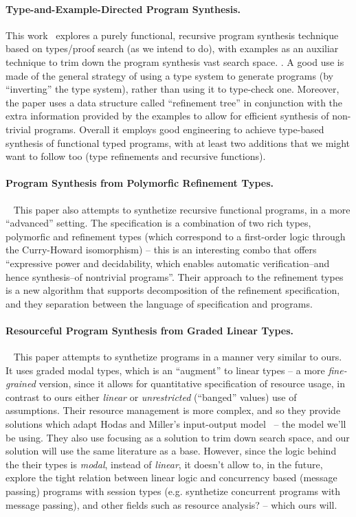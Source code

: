 \documentclass{llncs}
\newcommand{\mypara}[1]{\paragraph{\textbf{#1}.}}
\begin{document}
\mypara{Type-and-Example-Directed Program Synthesis} This
work~\cite{DBLP:conf/pldi/OseraZ15,DBLP:conf/popl/FrankleOWZ16}
explores a purely functional, recursive program synthesis technique
based on types/proof search (as we intend to do), with examples as an
auxiliar technique to trim down the program synthesis vast search
space.  .  A good use is
made of the general strategy of using a type system to generate
programs (by ``inverting'' the type system), rather than using it to
type-check one.  Moreover, the paper uses a data structure called
``refinement tree'' in conjunction with the extra information provided
by the examples to allow for efficient synthesis of non-trivial
programs. Overall it employs good engineering to achieve type-based
synthesis of functional typed programs, with at least two additions
that we might want to follow too (type refinements and recursive
functions).

  
\mypara{Program Synthesis from Polymorfic Refinement Types}~\cite{DBLP:conf/pldi/PolikarpovaKS16}
This paper also attempts to synthetize recursive functional programs, in a more ``advanced'' setting. The specification
is a combination of two rich types, polymorfic and refinement types (which correspond to a first-order logic through the Curry-Howard isomorphism) -- this is an interesting
combo that offers ``expressive power and decidability, which enables automatic verification--and hence synthesis--of nontrivial programs''.
Their approach to the refinement types is a new algorithm that supports decomposition of the refinement specification,
and they separation between the language of specification and programs.


\mypara{Resourceful Program Synthesis from Graded Linear Types}~\cite{DBLP:conf/lopstr/HughesO20}
This paper attempts to synthetize programs in a manner very similar to ours.
It uses graded modal types, which is an ``augment'' to linear types -- a more \emph{fine-grained} version, since it allows for
quantitative specification of resource usage, in contrast to ours either \emph{linear} or \emph{unrestricted} (``banged'' values) use of assumptions.
Their resource management is more complex, and so they provide solutions which adapt Hodas and Miller's input-output model~\cite{} -- the model we'll be using.
They also use focusing as a solution to trim down search space, and our solution will use the same literature as a base.
However, since the logic behind the their types is \emph{modal}, instead of \emph{linear}, it doesn't allow to, in the future, explore
the tight relation between linear logic and concurrency based (message passing) programs with session types (e.g. synthetize concurrent programs with message passing), and other fields such as
resource analysis? -- which ours will. 
\end{document}
